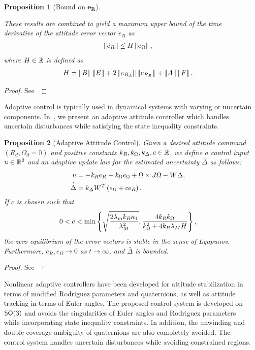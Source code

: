 \documentclass[10pt,fleqn]{IJCAS}  %
\newtheorem{prop}{Proposition}
\begin{document}
\begin{multicols}{2}
\begin{prop}[Bound on \( \bm{\dot{e}_R} \)]
\begin{enumerate}[(i)]
\end{enumerate}
These results are combined to yield a maximum upper bound of the time derivative of the attitude error vector \( \dot{e}_R \) as
\begin{gather}
	\left\| \dot{e}_R \right\| \leq H \left\| e_\Omega \right\| ,\label{eqn:eR_bound}
\end{gather}
where  \( H \in \mathbb{R} \) is defined as
\begin{gather}
	H = \left\| B \right\| \left\| E \right\| + 2 \left\| e_{R_A} \right\| \left\| e_{R_B} \right\| + \left\| A \right\|\left\| F \right\|. \label{eqn:H}
\end{gather}
\end{prop}
\begin{proof}
See~
\end{proof}

Adaptive control is typically used in dynamical systems with varying or uncertain components.
In~, we present an adaptive attitude controller which handles uncertain disturbances while satisfying the state inequality constraints.

\begin{prop}[Adaptive Attitude Control]\label{prop:adaptive_control}
Given  a desired attitude command \( (R_d, \Omega_d = 0 )\) and positive constants \( k_R, k_\Omega, k_\Delta, c \in \mathbb{R} \), we define a control input \( u \in \mathbb{R}^3\) and an adaptive update law for the estimated uncertainty \( \bar{\Delta} \) as follows:
\begin{align}
	u &= - k_R e_R - k_\Omega e_\Omega + \Omega \times J \Omega - W \bar{\Delta} , \label{eqn:adaptive_control} \\
	\dot{\bar{\Delta}} &= k_\Delta W^T \left( e_\Omega + c e_R \right) . \label{eqn:delta_dot}
\end{align}
If \( c \) is chosen such that
\begin{gather}
	0 < c < \min \left\{ \sqrt{\frac{2 \lambda_m k_R n_1}{\lambda_M^2}},
	\frac{4 k_R k_\Omega}{k_\Omega^2 + 4 k_R \lambda_M H} \right\} , \label{eqn:c_bound}
\end{gather}
  the zero equilibrium of the error vectors is stable in the sense of Lyapunov. Furthermore, $e_R,e_\Omega\rightarrow 0$ as $t\rightarrow\infty$, and $\bar\Delta$ is  bounded.
\end{prop}
\begin{proof}
See~
\end{proof}

Nonlinear adaptive controllers have been developed for attitude stabilization in terms of modified Rodriguez parameters and quaternions, as well as attitude tracking in terms of Euler angles. 
The proposed control system is developed on \(\mathsf{SO(3)}\) and avoids the singularities of Euler angles and Rodriguez parameters while incorporating state inequality constraints. 
In addition, the unwinding and double coverage ambiguity of quaternions are also completely avoided. 
The control system handles uncertain disturbances while avoiding constrained regions.


\end{multicols}
\end{document}

